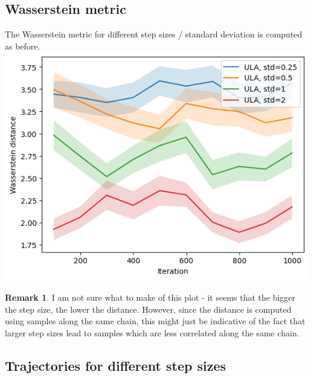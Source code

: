 \documentclass{article}
\theoremstyle{definition}
\newtheorem*{remark}{Remark}
\newcommand{\1}{\mathbbm{1}}
\begin{document}
\subsection{Wasserstein metric}
The Wasserstein metric for different step sizes / standard deviation is computed as before. \\
\includegraphics[width=0.8\linewidth,valign=m]{Different variance/var_plot.png}\\
\begin{remark}
	I am not sure what to make of this plot - it seems that the bigger the step size, the lower the distance. However, since the distance is computed using samples along the same chain, this might just be indicative of the fact that larger step sizes lead to samples which are less correlated along the same chain.
\end{remark}

\subsection{Trajectories for different step sizes}
\end{document}
